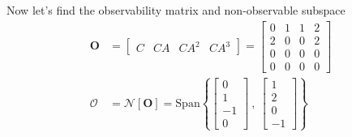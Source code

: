 \documentclass[twoside]{article}
\begin{document}
%
Now let's find the observability matrix and non-observable subspace
%
%
\begin{align*}
    \mathbf{O} &= \left[ \begin{array}{c} C & C A & C A^2 & C A^3 \end{array} \right] 
    =
    \left[ \begin{array}{cccc} 0 & 1 & 1 & 2 \\ 
    2 & 0 & 0 & 2 \\ 
    0 & 0 & 0 & 0 \\ 
    0 & 0 & 0 & 0 
    \end{array} \right] 
    \\
    \mathbf{\mathcal{O}} &= \mathcal{N}[ \mathbf{O} ] = \mathrm{Span} \left\lbrace 
    \left[ \begin{array}{c} 0 \\  1 \\  -1 \\  0  \end{array} \right] 
    \ , \
    \left[ \begin{array}{c} 1 \\  2 \\  0 \\  -1  \end{array} \right] 
    \right\rbrace
\end{align*}
%
\end{document}
